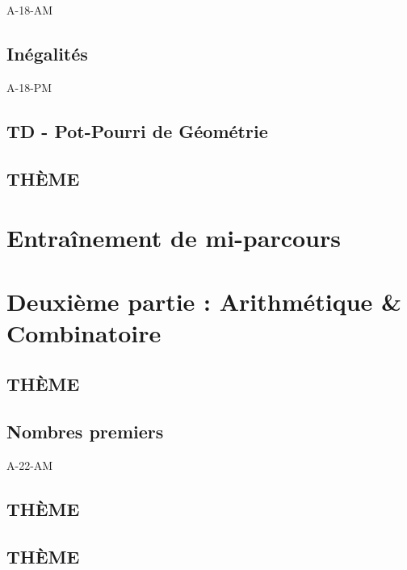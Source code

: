 \documentclass[poly,trombi]{valbonne}
\begin{document}
{A-18-AM}

\subsection{Inégalités}

{A-18-PM}

\subsection{TD - Pot-Pourri de Géométrie}


\subsection{THÈME}



\section{Entraînement de mi-parcours}



\section{Deuxième partie : Arithmétique \& Combinatoire}

\subsection{THÈME}


\subsection{Nombres premiers}

{A-22-AM}

\subsection{THÈME}


\subsection{THÈME}
\end{document}
